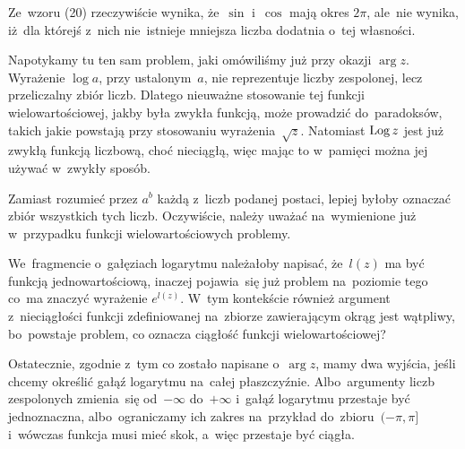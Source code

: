 \documentclass[a4paper,11pt]{article}
\begin{document}
\vspace{\spaceFour}





\noindent
{} Ze~wzoru (20) rzeczywiście wynika, że~$\sin$ i~$\cos$
mają okres $2\pi$, ale~nie wynika, iż~dla którejś z~nich nie~istnieje
mniejsza liczba dodatnia o~tej własności.

\vspace{\spaceFour}





\noindent
{} Napotykamy tu ten sam problem, jaki omówiliśmy już przy okazji
$\arg z$. Wyrażenie $\log a$, przy ustalonym~$a$, nie reprezentuje liczby
zespolonej, lecz przeliczalny zbiór liczb. Dlatego nieuważne stosowanie tej
funkcji wielowartościowej, jakby była zwykła funkcją, może prowadzić
do~paradoksów, takich jakie powstają przy stosowaniu
wyrażenia~$\sqrt{ z }$. Natomiast $\operatorname{Log} z$ jest już zwykłą funkcją
liczbową, choć nieciągłą, więc mając to w~pamięci można jej używać w~zwykły
sposób.

\vspace{\spaceFour}





\noindent
{} Zamiast rozumieć przez $a^{ b }$ każdą z~liczb podanej postaci,
lepiej byłoby oznaczać zbiór wszystkich tych liczb. Oczywiście, należy
uważać na~wymienione już w~przypadku funkcji wielowartościowych problemy.

\vspace{\spaceFour}





\noindent
{} We~fragmencie o~gałęziach logarytmu należałoby napisać,
że~$l( z )$ ma być funkcją jednowartościową, inaczej pojawia~się już
problem na~poziomie tego co~ma znaczyć wyrażenie $e^{ l( z ) }$. W~tym
kontekście również argument z~nieciągłości funkcji zdefiniowanej na~zbiorze
zawierającym okrąg jest wątpliwy, bo~powstaje problem, co oznacza ciągłość
funkcji wielowartościowej?

Ostatecznie, zgodnie z~tym co zostało napisane o~$\arg z$, mamy dwa
wyjścia, jeśli chcemy określić gałąź logarytmu na~całej płaszczyźnie.
Albo~argumenty liczb zespolonych zmienia~się od~$-\infty$ do~$+\infty$
i~gałąź logarytmu przestaje być jednoznaczna, albo~ograniczamy ich
zakres na~przykład do~zbioru~$( -\pi, \pi ]$ i~wówczas funkcja musi
mieć skok, a~więc przestaje być ciągła.
\end{document}
